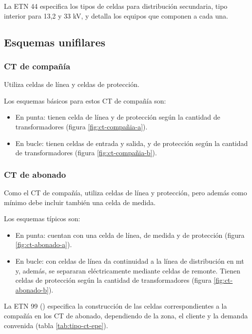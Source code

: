 La ETN 44 \cite{etn-44}especifica los tipos de celdas para distribución secundaria, tipo interior para 13,2 y 33 kV, y detalla los equipos que componen a cada una.

\subsection{Esquemas unifilares}

\subsubsection{CT de compañía}

Utiliza celdas de línea y celdas de protección.

Los esquemas básicos para estos CT de compañía son:
\begin{itemize}
	\item En punta: tienen celda de línea y de protección según la cantidad de transformadores (figura \ref{fig:ct-compañia-a}).
	\item En bucle: tienen celdas de entrada y salida, y de protección según la cantidad de transformadores (figura \ref{fig:ct-compañia-b}).
\end{itemize}


\subsubsection{CT de abonado}

Como el CT de compañía, utiliza celdas de línea y protección, pero además como mínimo debe incluir también una celda de medida. 

Los esquemas típicos son:
\begin{itemize}
	\item En punta: cuentan con una celda de línea, de medida y de protección (figura \ref{fig:ct-abonado-a}).
	\item En bucle: con celdas de línea da continuidad a la línea de distribución en \acrshort{mt} y, además, se separaran eléctricamente mediante celdas de remonte. Tienen celdas de protección según la cantidad de transformadores (figura \ref{fig:ct-abonado-b}).
\end{itemize}


La ETN 99 (\cite{etn-99}) especifica la construcción de las celdas correspondientes a la compañía en los CT de abonado, dependiendo de la zona, el cliente y la demanda convenida (tabla \ref{tab:tipo-ct-epe}).

